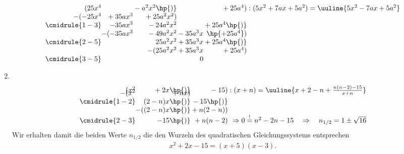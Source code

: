 \begin{enumerate}[label=(\alph*), labelindent=1em,labelsep=0.5cm]
    \begin{align}
        \begin{array}{r@{} r@{} r@{} r@{} r@{} r}
            (25x^4 &{}&{}-a^2x^2\hp{)}&{}&{}+25a^4) &\;:(5x^2 
            + 7ax +5a^2) = \uuline{5x^2 -7ax +5a^2} \\
          -(-25x^4 &{}+35ax^3&{}+25a^2x^2) \\ 
          \cmidrule{1-3}
                & -35ax^3 &{} -24a^2x^2 &{}&{}+25a^4\hp{)}\\
                &-(-35ax^3&{} -49a^2x^2&{}-35a^3 x&{}\hp{+25a^4}) \\
          \cmidrule{2-5}
                & &{}25a^2 x^2&{}+35a^3x&{}+{25a^4}\hp{)}\\
                & &-(25a^2 x^2&{}+35a^3x&{}+{25a^4})\\
          \cmidrule{3-5} 
                & & & 0
        \end{array}
    \end{align}
    \item$~$\\[-1.3cm]
    \begin{align}
        \begin{array}{r@{} r@{} r@{} r}
            (x^2 &{} +2x \hp{)}&{}-15) &\;:(x+n) = \uuline{x+2-n + \frac{n(n-2)-15}{x+n}} \\[-3mm]
          -(x^2 &{}+nx) \\ 
          \cmidrule{1-2}
                & (2-n)x \hp{)}&{} -15\hp{)}\\
                &-((2-n)x\hp{)}&{} +n(2-n)) \\
          \cmidrule{2-3}
                & -15\hp{)}&{}+n(n-2) & \Rightarrow 0 \overset{!}{=} n^2 - 2n -15 \quad \Rightarrow \quad n_{1/2} = 1 \pm \sqrt{16}
        \end{array}
    \end{align}
    Wir erhalten damit die beiden Werte $n_{1/2}$ die den Wurzeln des quadratischen Gleichungssystems entsprechen 
    \begin{align}
        x^2 + 2x -15 = (x+5)(x-3).
    \end{align}
\end{enumerate}

\newpage

